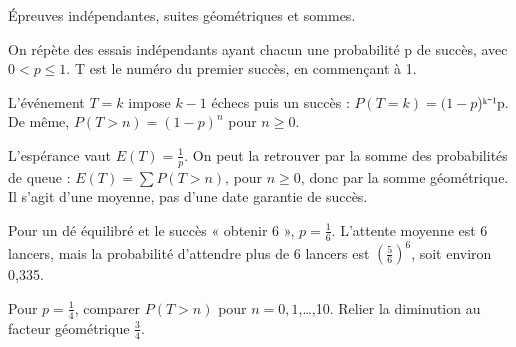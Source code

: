 \documentclass[11pt]{article}
\begin{document}
Épreuves indépendantes, suites géométriques et sommes.\par
{}
On répète des essais indépendants ayant chacun une probabilité p de succès, avec \(0 < p \leq  1\). T est le numéro du premier succès, en commençant à 1.\par
L’événement \(T = k\) impose \(k-1\) échecs puis un succès : \(P(T=k) = (1-p\))ᵏ⁻¹p. De même, \(P(T>n) = (1-p)^{n}\) pour \(n \geq  0\).\par
L’espérance vaut \(E(T)=\frac{1}{p}\). On peut la retrouver par la somme des probabilités de queue : \(E(T)=\sum  P(T>n)\), pour \(n \geq  0\), donc par la somme géométrique. Il s’agit d’une moyenne, pas d’une date garantie de succès.\par
{}
Pour un dé équilibré et le succès « obtenir 6 », \(p=\frac{1}{6}\). L’attente moyenne est 6 lancers, mais la probabilité d’attendre plus de 6 lancers est \((\frac{5}{6})^{6}\), soit environ 0,335.\par
{}
Pour \(p=\frac{1}{4}\), comparer \(P(T>n)\) pour \(n=0,1\),…,10. Relier la diminution au facteur géométrique \(\frac{3}{4}\).\par
\end{document}
